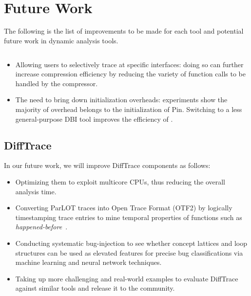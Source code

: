 \section{Future Work}
The following is the list of improvements to be made for each tool and potential future work in dynamic analysis tools.

\subsection{\parlot}
\begin{itemize}
  \item Allowing users to selectively trace at specific interfaces: doing so can further increase compression efficiency
  by reducing the variety of function calls to be handled by
  the compressor.
  \item The need to bring down initialization overheads: experiments show the majority of overhead belongs to the initialization of Pin. Switching to a less general-purpose DBI tool improves the efficiency of \parlot.
\end{itemize}
\subsection{DiffTrace}
In our future work, we will improve DiffTrace components as follows:
%
\begin{itemize}
  \item Optimizing them to exploit multicore CPUs, thus reducing the overall analysis time.
  \item Converting ParLOT traces into Open Trace Format (OTF2) by logically timestamping trace entries to mine temporal properties of functions such as \textit{happened-before}~\cite{lamport}.
  \item Conducting systematic bug-injection to see whether concept lattices and loop structures can be used as elevated features for precise bug classifications via machine learning and neural network techniques.
  \item Taking up more challenging and real-world examples to evaluate DiffTrace against similar tools and release it to the community.
\end{itemize}
